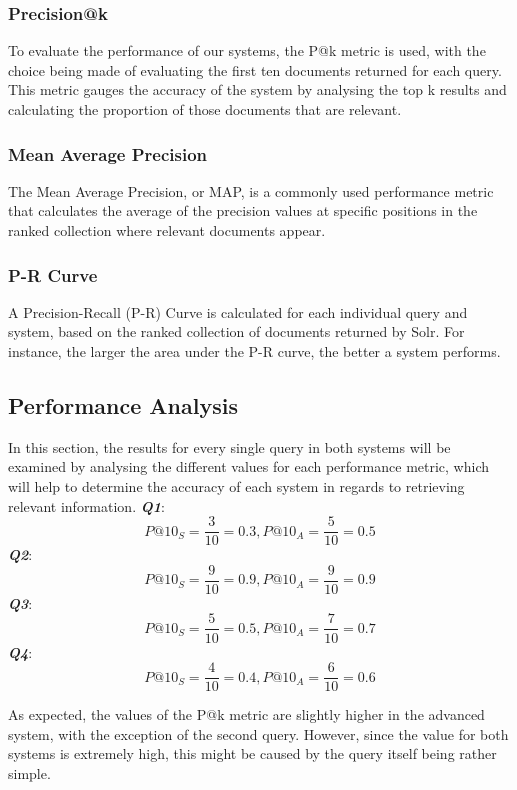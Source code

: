 \documentclass[sigconf]{acmart}
\begin{document}
\subsubsection{Precision@k}

To evaluate the performance of our systems, the P@k metric\cite{pak} is used, with the choice being made of evaluating the first ten documents returned for each query. This metric gauges the accuracy of the system by analysing the top k results and calculating the proportion of those documents that are relevant. 

\subsubsection{Mean Average Precision}

The Mean Average Precision\cite{map}, or MAP, is a commonly used performance metric that calculates the average of the precision values at specific positions in the ranked collection where relevant documents appear.

\subsubsection{P-R Curve}

A Precision-Recall (P-R) Curve\cite{prcurves} is calculated for each individual query and system, based on the ranked collection of documents returned by Solr. For instance, the larger the area under the P-R curve\cite{auc}, the better a system performs.

\subsection{Performance Analysis}

In this section, the results for every single query in both systems will be examined by analysing the different values for each performance metric, which will help to determine the accuracy of each system in regards to retrieving relevant information.\newline
\textbf{\textit{Q1}}:
\[
P@10_S = \frac{3}{10} = 0.3	,	P@10_A = \frac{5}{10} = 0.5
\]
\textbf{\textit{Q2}}:
\[
P@10_S = \frac{9}{10} = 0.9	,	P@10_A = \frac{9}{10} = 0.9
\]
\textbf{\textit{Q3}}:
\[
P@10_S = \frac{5}{10} = 0.5	,	P@10_A = \frac{7}{10} = 0.7
\]
\textbf{\textit{Q4}}:
\[
P@10_S = \frac{4}{10} = 0.4	,	P@10_A = \frac{6}{10} = 0.6
\]

As expected, the values of the P@k metric are slightly higher in the advanced system, with the exception of the second query. However, since the value for both systems is extremely high, this might be caused by the query itself being rather simple.
\end{document}
